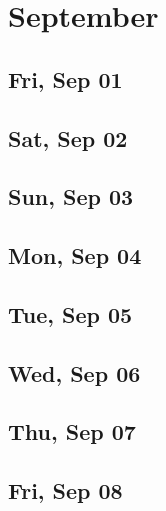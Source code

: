 \chapter{September}
	\section{Fri, Sep 01}
		
		
	\section{Sat, Sep 02}
		
		
	\section{Sun, Sep 03}
		
		
	\section{Mon, Sep 04}
		
		
	\section{Tue, Sep 05}
		
		
	\section{Wed, Sep 06}
		
		
	\section{Thu, Sep 07}
		
		
	\section{Fri, Sep 08}
		
		
